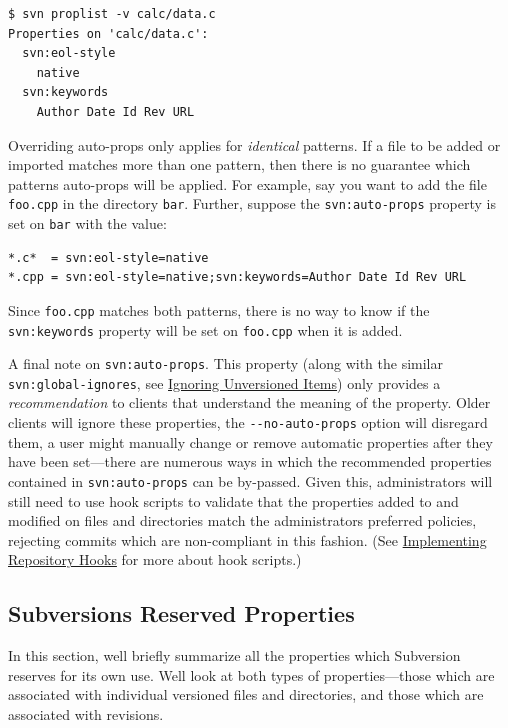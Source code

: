 \begin{verbatim}
$ svn proplist -v calc/data.c
Properties on 'calc/data.c':
  svn:eol-style
    native
  svn:keywords
    Author Date Id Rev URL
\end{verbatim}

Overriding auto-props only applies for \emph{identical} patterns. If a
file to be added or imported matches more than one pattern, then there
is no guarantee which pattern\textquotesingle s auto-props will be
applied. For example, say you want to add the file \texttt{foo.cpp} in
the directory \texttt{bar}. Further, suppose the \texttt{svn:auto-props}
property is set on \texttt{bar} with the value:

\begin{verbatim}
*.c*  = svn:eol-style=native
*.cpp = svn:eol-style=native;svn:keywords=Author Date Id Rev URL
\end{verbatim}

Since \texttt{foo.cpp} matches both patterns, there is no way to know if
the \texttt{svn:keywords} property will be set on \texttt{foo.cpp} when
it is added.

A final note on \texttt{svn:auto-props}. This property (along with the
similar \texttt{svn:global-ignores}, see
\hyperref[svn.advanced.props.special.ignore]{Ignoring Unversioned
Items}) only provides a \emph{recommendation} to clients that understand
the meaning of the property. Older clients will ignore these properties,
the \texttt{-\/-no-auto-props} option will disregard them, a user might
manually change or remove automatic properties after they have been
set---there are numerous ways in which the recommended properties
contained in \texttt{svn:auto-props} can be by-passed. Given this,
administrators will still need to use hook scripts to validate that the
properties added to and modified on files and directories match the
administrator\textquotesingle s preferred policies, rejecting commits
which are non-compliant in this fashion. (See
\hyperref[svn.reposadmin.hooks]{Implementing Repository Hooks} for more
about hook scripts.)

\subsection{Subversion\textquotesingle s Reserved
Properties}\label{svn.advanced.props.ref}

In this section, we\textquotesingle ll briefly summarize all the
properties which Subversion reserves for its own use.
We\textquotesingle ll look at both types of properties---those which are
associated with individual versioned files and directories, and those
which are associated with revisions.

